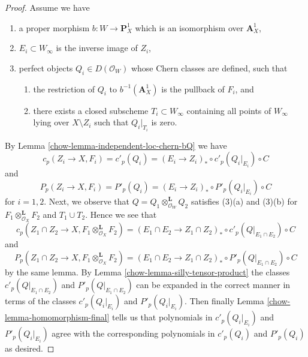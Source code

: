 \begin{proof}
\medskip\noindent
Assume we have
\begin{enumerate}
\item a proper morphism $b : W \to \mathbf{P}^1_X$ which is an isomorphism
over $\mathbf{A}^1_X$,
\item $E_i \subset W_\infty$ is the inverse image of $Z_i$,
\item perfect objects $Q_i \in D(\mathcal{O}_W)$ whose Chern classes
are defined, such that
\begin{enumerate}
\item the restriction of $Q_i$ to $b^{-1}(\mathbf{A}^1_X)$ is
the pullback of $F_i$, and
\item there exists a closed subscheme $T_i \subset W_\infty$ containing
all points of $W_\infty$ lying over $X \setminus Z_i$ such that
$Q_i|_{T_i}$ is zero.
\end{enumerate}
\end{enumerate}
By Lemma \ref{chow-lemma-independent-loc-chern-bQ} we have
$$
c_p(Z_i \to X, F_i) = c'_p(Q_i) =
(E_i \to Z_i)_* \circ c'_p(Q_i|_{E_i}) \circ C
$$
and
$$
P_p(Z_i \to X, F_i) = P'_p(Q_i) =
(E_i \to Z_i)_* \circ P'_p(Q_i|_{E_i}) \circ C
$$
for $i = 1, 2$. Next, we observe that
$Q = Q_1 \otimes_{\mathcal{O}_W}^\mathbf{L} Q_2$
satisfies (3)(a) and (3)(b) for $F_1 \otimes_{\mathcal{O}_X}^\mathbf{L} F_2$
and $T_1 \cup T_2$. Hence we see that
$$
c_p(Z_1 \cap Z_2 \to X, F_1 \otimes_{\mathcal{O}_X}^\mathbf{L} F_2) =
(E_1 \cap E_2 \to Z_1 \cap Z_2)_* \circ
c'_p(Q|_{E_1 \cap E_2}) \circ C
$$
and
$$
P_p(Z_1 \cap Z_2 \to X, F_1 \otimes_{\mathcal{O}_X}^\mathbf{L} F_2) =
(E_1 \cap E_2 \to Z_1 \cap Z_2)_* \circ
P'_p(Q|_{E_1 \cap E_2}) \circ C
$$
by the same lemma. By Lemma \ref{chow-lemma-silly-tensor-product}
the classes $c'_p(Q|_{E_1 \cap E_2})$ and $P'_p(Q|_{E_1 \cap E_2})$
can be expanded in the correct manner in terms of the classes
$c'_p(Q_i|_{E_i})$ and $P'_p(Q_i|_{E_i})$. Then finally
Lemma \ref{chow-lemma-homomorphism-final}
tells us that polynomials in $c'_p(Q_i|_{E_i})$ and $P'_p(Q_i|_{E_i})$
agree with the corresponding polynomials in
$c'_p(Q_i)$ and $P'_p(Q_i)$ as desired.
\end{proof}

